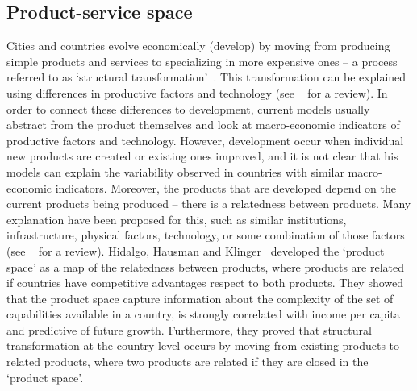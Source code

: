 \subsection{Product-service space}
Cities and countries evolve economically (develop) by moving from producing simple products and services to specializing in more expensive ones -- a process referred to as `structural transformation'~\citep{smith1776, Romer1991,grossman1991,hidalgo2007}.
This transformation can be explained using differences in productive factors and technology (see ~\citep{hausmann2011} for a review).
In order to connect these differences to development, 
current models usually abstract from the product themselves and look at macro-economic indicators of productive factors and technology.
However, development occur when individual new products are created or existing ones improved,
and it is not clear that his models can explain the variability observed in countries with similar macro-economic indicators.
Moreover, the products that are developed depend on the current products being produced -- there is a relatedness between products.
Many explanation have been proposed for this, 
such as similar institutions, infrastructure, physical factors, technology, or some combination of those factors (see ~\cite{hidalgo2007} for a review).
Hidalgo, Hausman and Klinger~\cite{hidalgo2007, hausmann2011, Hausmann2006,hidalgo2009} developed the `product space' as a map of the relatedness between products,
where products are related if countries have competitive advantages respect to both products.
They showed that the product space capture information about the complexity of the set of capabilities available in a country, 
is strongly correlated with income per capita and predictive of future growth.
Furthermore, they proved that structural transformation at the country level occurs by moving from existing products to related products, 
where two products are related if they are closed in the `product space'.

